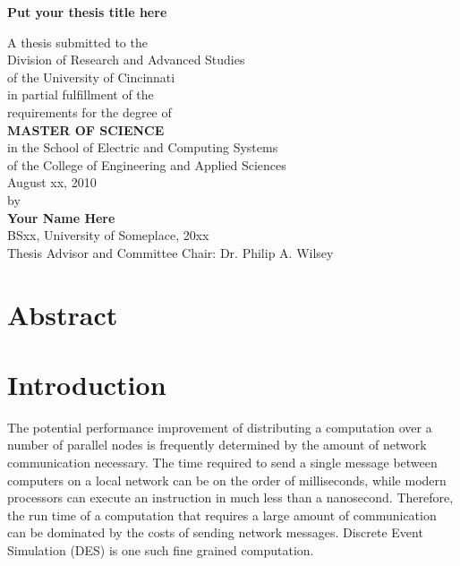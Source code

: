 \documentclass[11pt]{book}
\begin{document}
\thispagestyle{empty}

\doublespacing

\vspace*{0.5in}

\begin{center}
\LARGE{\textbf{Put your thesis title here}}

\vspace*{0.4in}

  {\large A thesis submitted to the\\[0.20in]
    Division of Research and Advanced Studies\\
    of the University of Cincinnati\\[0.20in]
    in partial fulfillment of the\\
    requirements for the degree of\\[0.20in]
    {\bf MASTER OF SCIENCE}\\[0.20in]
    in the School of Electric and Computing Systems\\
    of the College of Engineering and Applied Sciences\\[0.20in]
    August xx, 2010\\[0.20in]
    by\\[0.20in]
    {\bf Your Name Here}\\
    BSxx, University of Someplace, 20xx\\}
  \vspace{0.5in}
  {\large Thesis Advisor and Committee Chair:  Dr. Philip A. Wilsey}
\end{center}

\clearpage

\setcounter{page}{1}
\clearpage

\chapter*{Abstract} 




\tableofcontents \markright{ }
\listoffigures \markright{ }
\listoftables \markright{ }

\clearpage
{} \setcounter{page}{1}

\chapter{Introduction}\label{intro} 

The potential performance improvement of distributing a computation over a number of parallel nodes is frequently determined by the amount of network communication necessary. The time required to send a single message between computers on a local network can be on the order of milliseconds, while modern processors can execute an instruction in much less than a nanosecond. Therefore, the run time of a computation that requires a large amount of communication can be dominated by the costs of sending network messages.  Discrete Event Simulation (DES) is one such fine grained computation.
\end{document}
